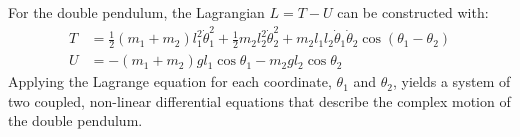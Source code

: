 For the double pendulum, the Lagrangian $L=T-U$ can be constructed with:
\begin{align*}
    T &= \frac{1}{2}(m_1+m_2)l_1^2\dot{\theta}_1^2 + \frac{1}{2}m_2l_2^2\dot{\theta}_2^2 + m_2l_1l_2\dot{\theta}_1\dot{\theta}_2\cos(\theta_1-\theta_2) \\
    U &= -(m_1+m_2)gl_1\cos\theta_1 - m_2gl_2\cos\theta_2
\end{align*}
Applying the Lagrange equation for each coordinate, $\theta_1$ and $\theta_2$, yields a system of two coupled, non-linear differential equations that describe the complex motion of the double pendulum.
